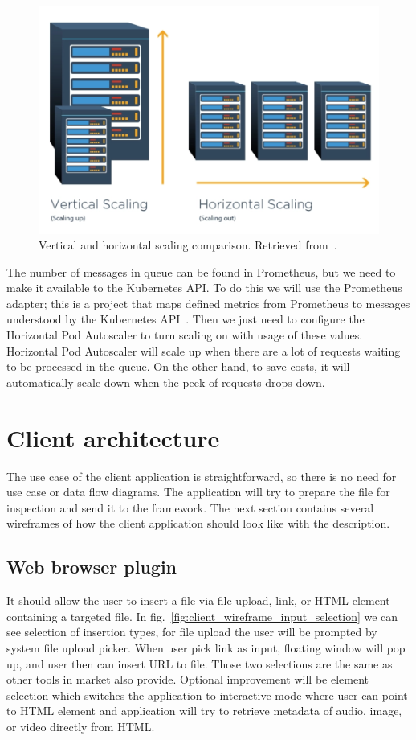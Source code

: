 \begin{figure}[H]
    \centering
    \includegraphics[width=.675\linewidth]{other-fig/scaling.png}
    \caption{Vertical and horizontal scaling comparison. Retrieved from~\cite{Scaling}.}
    \label{fig:scaling}
\end{figure}

The number of messages in queue can be found in Prometheus, but we need to make it available to the Kubernetes API. To do this we will use the Prometheus adapter; this is a project that maps defined metrics from Prometheus to messages understood by the Kubernetes API~\cite{PrometheusAdapter}. Then we just need to configure the Horizontal Pod Autoscaler to turn scaling on with usage of these values. Horizontal Pod Autoscaler will scale up when there are a lot of requests waiting to be processed in the queue. On the other hand, to save costs, it will automatically scale down when the peek of requests drops down.

\chapter{Client architecture}

The use case of the client application is straightforward, so there is no need for use case or data flow diagrams. The application will try to prepare the file for inspection and send it to the framework. The next section contains several wireframes of how the client application should look like with the description.

\section{Web browser plugin}

It should allow the user to insert a file via file upload, link, or HTML element containing a targeted file. In fig.~\ref{fig:client_wireframe_input_selection} we can see selection of insertion types, for file upload the user will be prompted by system file upload picker. When user pick link as input, floating window will pop up, and user then can insert URL to file. Those two selections are the same as other tools in market also provide. Optional improvement will be element selection which switches the application to interactive mode where user can point to HTML element and application will try to retrieve metadata of audio, image, or video directly from HTML. 

